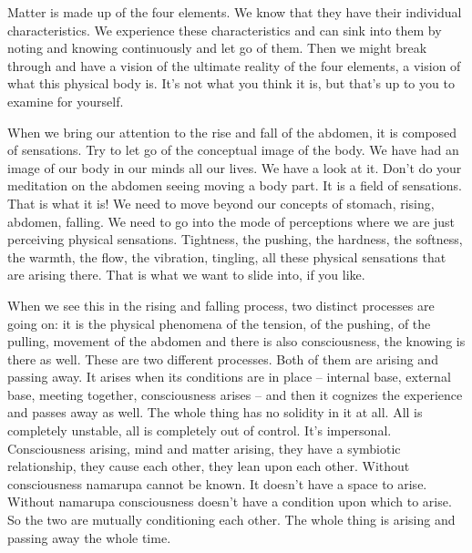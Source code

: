 \documentclass[letterpaper,10pt,english]{sphinxmanual}
\begin{document}
\sphinxAtStartPar
Matter is made up of the four elements. We know that they have their
individual characteristics. We experience these characteristics and can sink
into them by noting and knowing continuously and let go of them. Then we
might break through and have a vision of the ultimate reality of the four elements, a vision of what this physical body is. It’s not what you think it is, but
that’s up to you to examine for yourself.

\sphinxAtStartPar
When we bring our attention to the rise and fall of the abdomen, it is
composed of sensations. Try to let go of the conceptual image of the body.
  We have had an image of our body in our minds all our lives. We have a look
at it. Don’t do your meditation on the abdomen seeing moving a body part.
It is a field of sensations. That is what it is! We need to move beyond our
concepts of stomach, rising, abdomen, falling. We need to go into the mode
of perceptions where we are just perceiving physical sensations. Tightness,
the pushing, the hardness, the softness, the warmth, the flow, the vibration,
tingling, all these physical sensations that are arising there. That is what we
want to slide into, if you like.

\sphinxAtStartPar
When  we  see  this  in  the  rising  and  falling  process,  two  distinct  processes are going on: it is the physical phenomena of the tension, of the pushing, of the pulling, movement of the abdomen and there is also consciousness, the knowing is there as well. These are two different processes. Both
of them are arising and passing away.
It  arises  when  its  conditions  are  in  place  –  internal  base,  external
base, meeting together, consciousness arises – and then it cognizes the experience and passes away as well. The whole thing has no solidity in it at all.
All is completely unstable, all is completely out of control. It’s impersonal.
Consciousness arising, mind and matter arising, they have a symbiotic relationship,  they  cause  each  other,  they  lean  upon  each  other.  Without  consciousness  nama\sphinxhyphen{}rupa  cannot  be  known.  It  doesn’t  have  a  space  to  arise.
Without nama\sphinxhyphen{}rupa consciousness doesn’t have a condition upon which to
arise. So the two are mutually conditioning each other. The whole thing is
arising and passing away the whole time.
\end{document}

